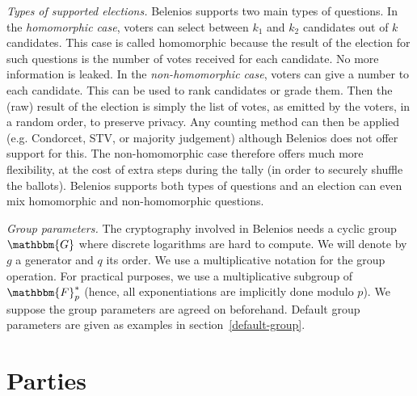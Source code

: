 \documentclass[a4paper]{article}
\newcommand{\F}{\mathbbm{F}}
\newcommand{\G}{\mathbbm{G}}
\begin{document}
{\it Types of supported elections.}
Belenios supports two main types of questions.
In the \emph{homomorphic case}, voters can select between $k_1$ and
$k_2$ candidates out of $k$ candidates. This case is called
homomorphic because the result of the election for such questions is
the number of votes received for each candidate. No more information
is leaked.
In the \emph{non-homomorphic case}, voters can give a number to each
candidate. This can be used to rank candidates or grade them. Then the
(raw) result of the election is simply the list of votes, as emitted
by the voters, in
a random order, to preserve privacy.
Any counting method can then be  applied
(e.g. Condorcet, STV, or majority judgement) although Belenios does
not offer support for this.
The non-homomorphic case  therefore offers much more flexibility, at
the cost of extra steps during the tally (in order to securely shuffle
the ballots).
Belenios supports both types of questions and an election can even
mix homomorphic and non-homomorphic questions.
\medskip

{\it Group parameters.}
The cryptography involved in Belenios needs a cyclic group $\G$ where
discrete logarithms are hard to compute. We will denote by $g$ a
generator and $q$ its order. We use a multiplicative notation for the
group operation. For practical purposes, we use a multiplicative
subgroup of $\F^*_p$ (hence, all exponentiations are implicitly done
modulo $p$). We suppose the group parameters are agreed on
beforehand. Default group parameters are given as examples in
section~\ref{default-group}.

\section{Parties}

\newcommand{\pk}{\texttt{public\_key}}
\newcommand{\sk}{\texttt{private\_key}}
\newcommand{\proof}{\texttt{proof}}
\newcommand{\iproof}{\texttt{iproof}}
\newcommand{\ciphertext}{\texttt{ciphertext}}

\newcommand{\pklabel}{\textsf{public\_key}}
\newcommand{\pok}{\textsf{pok}}
\newcommand{\challenge}{\textsf{challenge}}
\newcommand{\response}{\textsf{response}}
\newcommand{\alphalabel}{\textsf{alpha}}
\newcommand{\betalabel}{\textsf{beta}}
\newcommand{\Hash}{\mathcal{H}}
\end{document}
